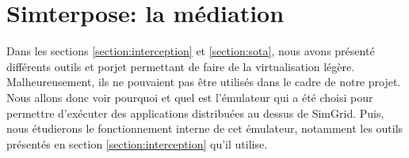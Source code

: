 \section{Simterpose: la médiation}
\label{section:simterpose}

Dans les sections \ref{section:interception} et \ref{section:sota}, nous avons présenté différents outils et porjet permettant de
faire de la virtualisation légère. Malheureusement, ils ne pouvaient pas être
utilisés dans le cadre de notre projet. Nous allons donc voir pourquoi et quel
est l'émulateur qui a été choisi pour permettre d'exécuter des applications
distribuées au dessus de SimGrid. Puis, nous étudierons le fonctionnement interne de
cet émulateur, notamment les outils présentés en section \ref{section:interception}
qu'il utilise.
